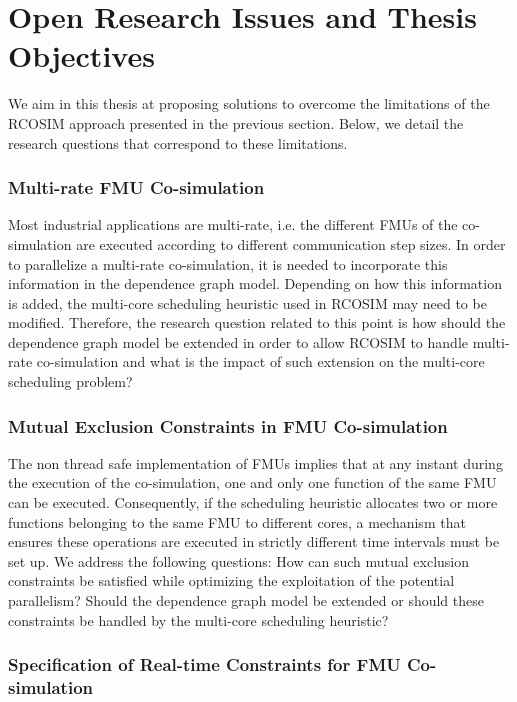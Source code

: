 \section{Open Research Issues and Thesis Objectives}

We aim in this thesis at proposing solutions to overcome the limitations of the RCOSIM approach presented in the previous section. Below, we detail the research questions that correspond to these limitations.

\subsubsection{Multi-rate FMU Co-simulation}

Most industrial applications are multi-rate, i.e. the different FMUs of the co-simulation are executed according to different communication step sizes. In order to parallelize a multi-rate co-simulation, it is needed to incorporate this information in the dependence graph model. Depending on how this information is added, the multi-core scheduling heuristic used in RCOSIM may need to be modified. Therefore, the research question related to this point is how should the dependence graph model be extended in order to allow RCOSIM to handle multi-rate co-simulation and what is the impact of such extension on the multi-core scheduling problem?

\subsubsection{Mutual Exclusion Constraints in FMU Co-simulation}

The non thread safe implementation of FMUs implies that at any instant during the execution of the co-simulation, one and only one function of the same FMU can be executed. Consequently, if the scheduling heuristic allocates two or more functions belonging to the same FMU to different cores, a mechanism that ensures these operations are executed in strictly different time intervals must be set up. We address the following questions: How can such mutual exclusion constraints be satisfied while optimizing the exploitation of the potential parallelism? Should the dependence graph model be extended or should these constraints be handled by the multi-core scheduling heuristic?

\subsubsection{Specification of Real-time Constraints for FMU Co-simulation}

